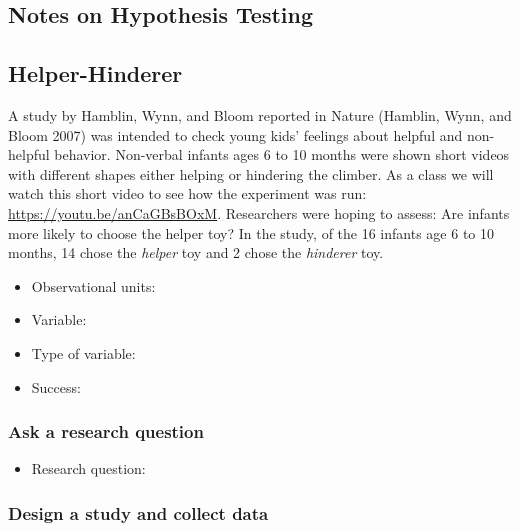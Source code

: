 \documentclass[
]{report}
\providecommand{\tightlist}{%
  \setlength{\itemsep}{0pt}\setlength{\parskip}{0pt}}
\begin{document}
\newpage

\subsection*{Notes on Hypothesis Testing}\label{notes-on-hypothesis-testing}

\vspace{4in}

\subsection{Helper-Hinderer}\label{helper-hinderer}

A study by Hamblin, Wynn, and Bloom reported in Nature (Hamblin, Wynn, and Bloom 2007) was intended to check young kids' feelings about helpful and non-helpful behavior. Non-verbal infants ages 6 to 10 months were shown short videos with different shapes either helping or hindering the climber. As a class we will watch this short video to see how the experiment was run: \url{https://youtu.be/anCaGBsBOxM}. Researchers were hoping to assess: Are infants more likely to choose the helper toy? In the study, of the 16 infants age 6 to 10 months, 14 chose the \emph{helper} toy and 2 chose the \emph{hinderer} toy.

\begin{itemize}
\item
  Observational units:
\item
  Variable:
\item
  Type of variable:
\item
  Success:
\end{itemize}

\subsubsection*{Ask a research question}\label{ask-a-research-question}

\begin{itemize}
\tightlist
\item
  Research question:
\end{itemize}

\vspace{0.2in}

\subsubsection*{Design a study and collect data}\label{design-a-study-and-collect-data}
\end{document}
